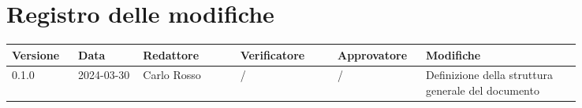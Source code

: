 \section*{Registro delle modifiche}
 {
  \renewcommand{\arraystretch}{1.5}
  \scriptsize
  \begin{longtable}{p{0.10\linewidth}p{0.10\linewidth}p{0.15\linewidth}p{0.15\linewidth}p{0.10\linewidth}p{0.24\linewidth}}
	  \textbf{Versione} & \textbf{Data} & \textbf{Redattore} & \textbf{Verificatore} & \textbf{Approvatore} & \textbf{Modifiche}                                 \\
	  \toprule
	  0.1.0             & 2024-03-30    & Carlo Rosso        & /                     & /                    & Definizione della struttura generale del documento \\
	  \bottomrule
  \end{longtable}
 }
